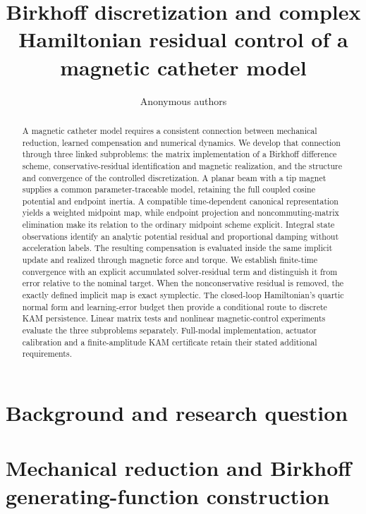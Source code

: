 \documentclass[doublespace,Afour,sageh,times]{sagej}
\begin{document}
\title{Birkhoff discretization and complex Hamiltonian residual control of a magnetic catheter model}
\author{Anonymous authors}
\begin{abstract}
A magnetic catheter model requires a consistent connection between mechanical reduction, learned compensation and numerical dynamics. We develop that connection through three linked subproblems: the matrix implementation of a Birkhoff difference scheme, conservative-residual identification and magnetic realization, and the structure and convergence of the controlled discretization. A planar beam with a tip magnet supplies a common parameter-traceable model, retaining the full coupled cosine potential and endpoint inertia. A compatible time-dependent canonical representation yields a weighted midpoint map, while endpoint projection and noncommuting-matrix elimination make its relation to the ordinary midpoint scheme explicit. Integral state observations identify an analytic potential residual and proportional damping without acceleration labels. The resulting compensation is evaluated inside the same implicit update and realized through magnetic force and torque. We establish finite-time convergence with an explicit accumulated solver-residual term and distinguish it from error relative to the nominal target. When the nonconservative residual is removed, the exactly defined implicit map is exact symplectic. The closed-loop Hamiltonian's quartic normal form and learning-error budget then provide a conditional route to discrete KAM persistence. Linear matrix tests and nonlinear magnetic-control experiments evaluate the three subproblems separately. Full-modal implementation, actuator calibration and a finite-amplitude KAM certificate retain their stated additional requirements.
\end{abstract}
\maketitle
\raggedbottom
\section{Background and research question}\label{sec:background}

\section{Mechanical reduction and Birkhoff generating-function construction}\label{sec:derivation}


\end{document}
